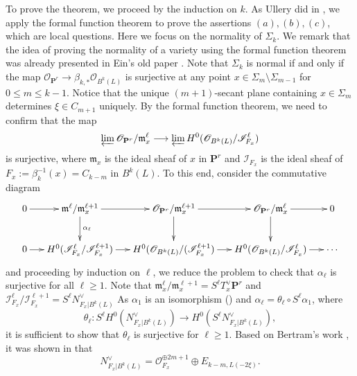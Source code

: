 \documentclass[graybox]{svmult}
\newcommand{\sO}{\mathscr{O}}
\newcommand{\sI}{\mathscr{I}}
\def\nP{\mathbf{P}}
\begin{document}
To prove the theorem, we proceed by the induction on $k$. As Ullery did in \cite{Ullery}, we apply the formal function theorem to prove the assertions $(a), (b), (c)$, which are local questions. Here we  focus on the normality of $\Sigma_k$. We remark that the idea of proving the normality of a variety using the formal function theorem was already presented in Ein's old paper \cite{Ein}. Note that $\Sigma_k$ is normal if and only if the map 
$\sO_{\nP^r} \to \beta_{k, *} \sO_{B^k(L)}$ is surjective at any point $x \in \Sigma_m \setminus \Sigma_{m-1}$ for $0 \leq m \leq k-1$. Notice that the unique $(m+1)$-secant plane containing $x \in \Sigma_m$ determines $\xi \in C_{m+1}$ uniquely. By the formal function theorem, we need to confirm that the map 
$$
\varprojlim \sO_{\nP^r}/\mathfrak{m}_x^{\ell} \longrightarrow \varprojlim H^0(\sO_{B^k(L)}/\sI_{F_x}^{\ell})
$$ 
is surjective, where $\mathfrak{m}_x$ is the ideal sheaf of $x$ in $\nP^r$ and $\sI_{F_x}$ is the ideal sheaf of $F_x:=\beta_k^{-1}(x)= C_{k-m}$ in $B^k(L)$. To this end, consider the commutative diagram
$$
\xymatrixcolsep{0.2in}
\xymatrix{
0\ar[r]&	\mathfrak{m}^{\ell}/\mathfrak{m}_x^{\ell+1} \ar[d]^-{\alpha_{\ell}} \ar[r] & \sO_{\nP^r}/\mathfrak{m}_x^{\ell+1} \ar[r]\ar[d]  & \sO_{\nP^r}/\mathfrak{m}_x^{\ell}\ar[d] \ar[r] & 0\\
0\ar[r]&	H^0(\sI_{F_x}^{\ell}/\sI_{F_x}^{\ell+1}) \ar[r]& H^0(\sO_{B^k(L)}/(\sI_{F_x}^{\ell+1})\ar[r]  & H^0(\sO_{B^k(L)}/\sI_{F_x}^{\ell})\ar[r] &\cdots
}
$$
and proceeding by induction on $\ell$, we reduce the problem to check that $\alpha_{\ell}$ is surjective for all $\ell \geq 1$. Note that $\mathfrak{m}_x^{\ell}/\mathfrak{m}_x^{\ell+1} = S^\ell T_x^\vee \nP^r$ and $\sI_{F_x}^{\ell}/\sI_{F_x}^{\ell+1} = S^{\ell} N_{F_x|B^k(L)}^{\vee}$
As $\alpha_1$ is an isomorphism (\cite[Proposition 3.13]{ENP1}) and $\alpha_{\ell} = \theta_{\ell} \circ S^{\ell} \alpha_1$, where 
$$
\theta_{\ell} \colon S^{\ell} H^0(N_{F_x|B^k(L)}^{\vee}) \longrightarrow H^0(S^{\ell} N_{F_x|B^k(L)}^{\vee}),
$$ 
it is sufficient to show that $\theta_{\ell}$  is surjective for $\ell \geq 1$. Based on Bertram's work \cite{Bertram}, it was shown in \cite[Proposition 3.13]{ENP1} that 
$$
N_{F_x|B^k(L)}^{\vee} = \sO_{F_x}^{\oplus 2m+1} \oplus E_{k-m, L(-2\xi)}.
$$
\end{document}
